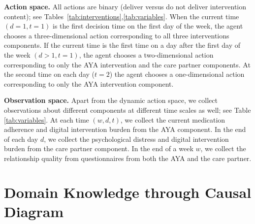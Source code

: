 
\textbf{Action space.} All actions are binary (deliver versus do not deliver intervention content); see Tables~\ref{tab:interventions},\ref{tab:variables}. When the current time $(d = 1, t = 1)$ is the first decision time on the first day of the week, the agent chooses a three-dimensional action corresponding to all three interventions components. If the current time is the first time  on a day after the first day of the week $(d> 1, t = 1)$, the agent chooses a two-dimensional action corresponding to only the AYA intervention and the care partner components. At the second time on each day ($t=2$) the agent chooses a one-dimensional action corresponding to only the AYA intervention component. %

\textbf{Observation space.} Apart from the dynamic action space, we collect observations about different components at different time scales as well; see Table \ref{tab:variables}. At each time $(w, d, t)$, we collect the current medication adherence and digital intervention burden from the AYA component. In the end of each day $d$, we collect the psychological distress and digital intervention burden from the care partner component. In the end of a week $w$, we collect the relationship quality from questionnaires from both the AYA and the care partner.  


\section{Domain Knowledge through Causal Diagram} 


